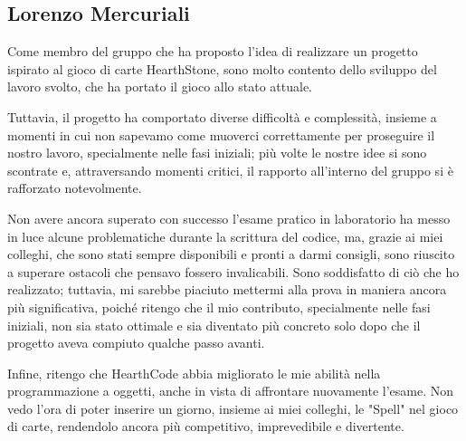 \subsection{Lorenzo Mercuriali}

Come membro del gruppo che ha proposto l'idea di realizzare un progetto ispirato al gioco di carte HearthStone, sono molto contento dello
sviluppo del lavoro svolto, che ha portato il gioco allo stato attuale.

Tuttavia, il progetto ha comportato diverse difficoltà e complessità, insieme a momenti in cui non sapevamo come
muoverci correttamente per proseguire il nostro lavoro, specialmente nelle fasi iniziali; più volte le nostre idee si sono scontrate
e, attraversando momenti critici, il rapporto all'interno del gruppo si è rafforzato notevolmente.

Non avere ancora superato con successo l'esame pratico in laboratorio ha messo in luce alcune problematiche durante la scrittura del codice, ma,
grazie ai miei colleghi, che sono stati sempre disponibili e pronti a darmi consigli, sono riuscito a superare ostacoli che pensavo fossero
invalicabili. Sono soddisfatto di ciò che ho realizzato; tuttavia, mi sarebbe piaciuto mettermi alla prova in maniera ancora più significativa,
poiché ritengo che il mio contributo, specialmente nelle fasi iniziali, non sia stato ottimale e sia diventato più concreto solo dopo che il progetto aveva compiuto
qualche passo avanti.

Infine, ritengo che HearthCode abbia migliorato le mie abilità nella programmazione a oggetti, anche in vista di affrontare nuovamente
l'esame. Non vedo l'ora di poter inserire un giorno, insieme ai miei colleghi, le "Spell" nel gioco di carte, rendendolo ancora
più competitivo, imprevedibile e divertente.
